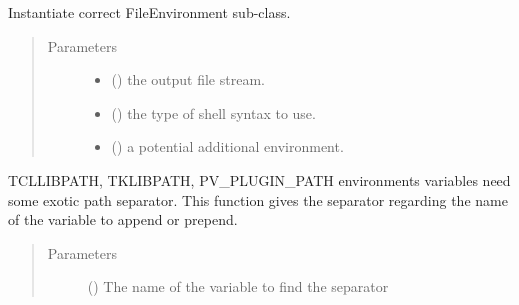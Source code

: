 \documentclass[a4paper,10pt,english]{sphinxmanual}
\begin{document}

\begin{fulllineitems}
\label{\detokenize{commands/apidoc/src:src.fileEnviron.get_file_environ}}
Instantiate correct FileEnvironment sub-class.
\begin{quote}\begin{description}
\item[{Parameters}] \leavevmode\begin{itemize}
\item {} 
 () \textendash{} the output file stream.

\item {} 
 () \textendash{} the type of shell syntax to use.

\item {} 
 () \textendash{} a potential additional environment.

\end{itemize}

\end{description}\end{quote}

\end{fulllineitems}


\begin{fulllineitems}
\label{\detokenize{commands/apidoc/src:src.fileEnviron.special_path_separator}}
TCLLIBPATH, TKLIBPATH, PV\_PLUGIN\_PATH environments variables need
some exotic path separator.
This function gives the separator regarding the name of the variable
to append or prepend.
\begin{quote}\begin{description}
\item[{Parameters}] \leavevmode
{} () \textendash{} The name of the variable to find the separator

\end{description}\end{quote}

\end{fulllineitems}
\end{document}
